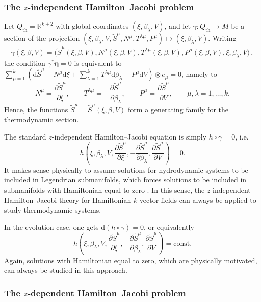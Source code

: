 \documentclass[11pt,twoside]{article}
\theoremstyle{plain}
\theoremstyle{definition}
\theoremstyle{remark}
\renewcommand{\d}{\mathrm{d}}
\begin{document}
\subsubsection{The \texorpdfstring{$z$}{}-independent Hamilton--Jacobi problem}

Let $Q_{\mathrm{th}}=\mathbb{R}^{k+2}$ with global coordinates $(\xi,\beta_\lambda,V)$, and let $\gamma\colon Q_{\mathrm{th}}\to M$ be a section of the projection $(\xi,\beta_\lambda,V,\widetilde{S}^\mu,N^\mu,T^{\lambda\mu},P^\mu)\mapsto (\xi,\beta_\lambda,V)$. Writing
\[
\gamma(\xi,\beta,V)=\bigl(\widetilde{S}^\mu(\xi,\beta,V),N^\mu(\xi,\beta,V),T^{\lambda\mu}(\xi,\beta,V),P^\mu(\xi,\beta,V),\xi,\beta_\lambda,V\bigr)\,,
\]
the condition $\gamma^*\bm\eta=0$ is equivalent to $\sum_{\mu=1}^k(\d \widetilde{S}^\mu-N^\mu \d\xi+\sum_{\lambda=1}^k T^{\lambda\mu}\d\beta_\lambda-P^\mu \d V)\otimes e_\mu=0$, namely to
\[
N^\mu=\frac{\partial \widetilde{S}^\mu}{\partial \xi},\qquad
T^{\lambda\mu}=-\frac{\partial \widetilde{S}^\mu}{\partial \beta_\lambda},\qquad
P^\mu=\frac{\partial \widetilde{S}^\mu}{\partial V},\qquad \mu,\lambda=1,\ldots,k.
\]
Hence, the functions $\widetilde{S}^\mu=\widetilde{S}^\mu(\xi,\beta,V)$ form a generating family for the thermodynamic section.

The standard $z$-independent Hamilton--Jacobi equation is simply $h\circ\gamma=0$, i.e.
\[
h\!\left(
\xi,\beta_\lambda,V,
\frac{\partial \widetilde{S}^\mu}{\partial \xi},
-\frac{\partial \widetilde{S}^\mu}{\partial \beta_\lambda},
\frac{\partial \widetilde{S}^\mu}{\partial V}
\right)=0.
\]
It makes sense physically to assume solutions for hydrodynamic systems to be included in Legendrian submanifolds, which forces solutions to be included in submanifolds with Hamiltonian equal to zero  \cite{HLM_26}. In this sense, the $z$-independent Hamilton--Jacobi theory for Hamiltonian $k$-vector fields can always be applied to study thermodynamic systems.

In the evolution case, one gets $\d(h\circ\gamma)=0$, or equivalently
\[
h\!\left(
\xi,\beta_\lambda,V,
\frac{\partial \widetilde{S}^\mu}{\partial \xi},
-\frac{\partial \widetilde{S}^\mu}{\partial \beta_\lambda},
\frac{\partial \widetilde{S}^\mu}{\partial V}
\right)=\mathrm{const}.
\]
Again, solutions with Hamiltonian equal to zero, which are physically motivated, can always be studied in this approach. 

\subsubsection{The \texorpdfstring{$z$}{}-dependent Hamilton--Jacobi problem}
\end{document}
